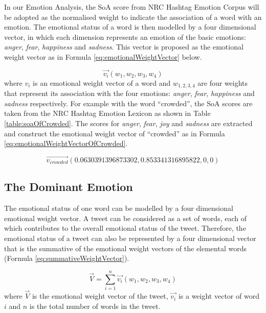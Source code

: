 In our Emotion Analysis, the SoA score from NRC Hashtag Emotion Corpus will be adopted as the normalised weight to indicate the association of a word with an emotion. The emotional status of a word is then modelled by a four dimensional vector, in which each dimension represents an emotion of the basic emotions: \textit{anger}, \textit{fear}, \textit{happiness} and \textit{sadness}. This vector is proposed as the emotional weight vector as in Formula \ref{eq:emotionalWeightVector} below.

\begin{equation}
\label{eq:emotionalWeightVector}
	\vec{v_i}(w_1, w_2, w_3, w_4)
\end{equation}
where \(v_i\) is an emotional weight vector of a word and \(w_{1,2,3,4}\) are four weights that represent its association with the four emotions: \textit{anger}, \textit{fear}, \textit{happiness} and \textit{sadness} respectively. For example with the word ``crowded'', the SoA scores are taken from the NRC Hashtag Emotion Lexicon as shown in Table \ref{table:soaOfCrowded}. The scores for \textit{anger}, \textit{fear}, \textit{joy} and \textit{sadness} are extracted and construct the emotional weight vector of ``crowded'' as in Formula \ref{eq:emotionalWeightVectorOfCrowded}.

\begin{equation}
\label{eq:emotionalWeightVectorOfCrowded}
	\vec{v_{crowded}}(0.0630391396873302, 0.853341316895822, 0, 0)
\end{equation}

\subsection{The Dominant Emotion}
The emotional status of one word can be modelled by a four dimensional emotional weight vector. A tweet can be considered as a set of words, each of which contributes to the overall emotional status of the tweet. Therefore, the emotional status of a tweet can also be represented by a four dimensional vector that is the summative of the emotional weight vectors of the elemental words (Formula \ref{eq:summativeWeightVector}).

\begin{equation}
\label{eq:summativeWeightVector}
	\vec{V} = \sum\limits_{i=1}^n \vec{v_i}(w_1, w_2, w_3, w_4)
\end{equation}
where \(\vec{V}\) is the emotional weight vector of the tweet, \(\vec{v_i}\) is a weight vector of word \(i\) and \(n\) is the total number of words in the tweet.


